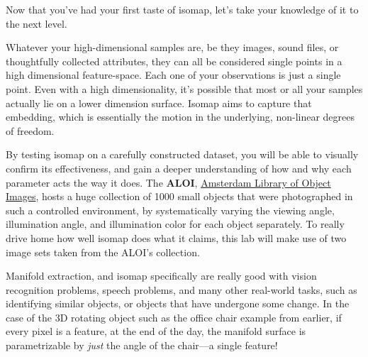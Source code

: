 \documentclass[11pt]{article}
\begin{document}
Now that you've had your first taste of isomap, let's take your
knowledge of it to the next level.

Whatever your high-dimensional samples are, be they images, sound files,
or thoughtfully collected attributes, they can all be considered single
points in a high dimensional feature-space. Each one of your
observations is just a single point. Even with a high dimensionality,
it's possible that most or all your samples actually lie on a lower
dimension surface. Isomap aims to capture that embedding, which is
essentially the motion in the underlying, non-linear degrees of freedom.

By testing isomap on a carefully constructed dataset, you will be able
to visually confirm its effectiveness, and gain a deeper understanding
of how and why each parameter acts the way it does. The \textbf{ALOI},
\href{http://aloi.science.uva.nl/}{Amsterdam Library of Object Images},
hosts a huge collection of 1000 small objects that were photographed in
such a controlled environment, by systematically varying the viewing
angle, illumination angle, and illumination color for each object
separately. To really drive home how well isomap does what it claims,
this lab will make use of two image sets taken from the ALOI's
collection.

Manifold extraction, and isomap specifically are really good with vision
recognition problems, speech problems, and many other real-world tasks,
such as identifying similar objects, or objects that have undergone some
change. In the case of the 3D rotating object such as the office chair
example from earlier, if every pixel is a feature, at the end of the
day, the manifold surface is parametrizable by \emph{just} the angle of
the chair---a single feature!
\end{document}
